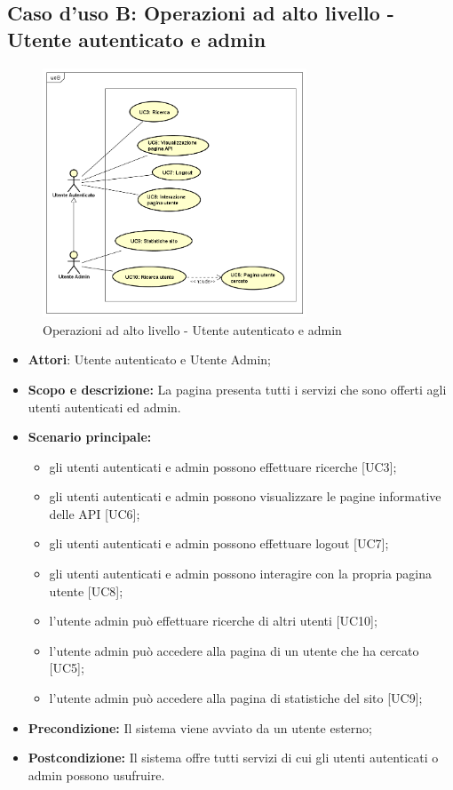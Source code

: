 \documentclass[12pt,a4paper,titlepage]{article}
\begin{document}
	\subsection{Caso d'uso B: Operazioni ad alto livello - Utente autenticato e admin}
	\begin{figure}[ht]
		\centering
		\includegraphics[width=0.7\textwidth]{UseCase/B}
		\caption{Operazioni ad alto livello - Utente autenticato e admin}
	\end{figure}
	\begin{itemize}
		\item \textbf{Attori}: Utente autenticato e Utente Admin;
		\item \textbf{Scopo e descrizione:} La pagina presenta tutti i servizi che sono offerti agli utenti autenticati ed admin.
		\item \textbf{Scenario principale:} 
			\begin{itemize}
				\item gli utenti autenticati e admin possono effettuare ricerche [UC3];
				\item gli utenti autenticati e admin possono visualizzare le pagine informative delle API [UC6];
				\item gli utenti autenticati e admin possono effettuare logout [UC7];
				\item gli utenti autenticati e admin possono  interagire con la propria pagina utente [UC8];
				\item l'utente admin può effettuare ricerche di altri utenti [UC10];
				\item l'utente admin può accedere alla pagina di un utente che ha cercato [UC5];
				\item l'utente admin può accedere alla pagina di statistiche del sito [UC9];
			\end{itemize}
		\item \textbf{Precondizione:} Il sistema viene avviato da un utente esterno;
		\item \textbf{Postcondizione:} Il sistema offre tutti servizi di cui gli utenti autenticati o admin possono usufruire.
	\end{itemize}
\end{document}
